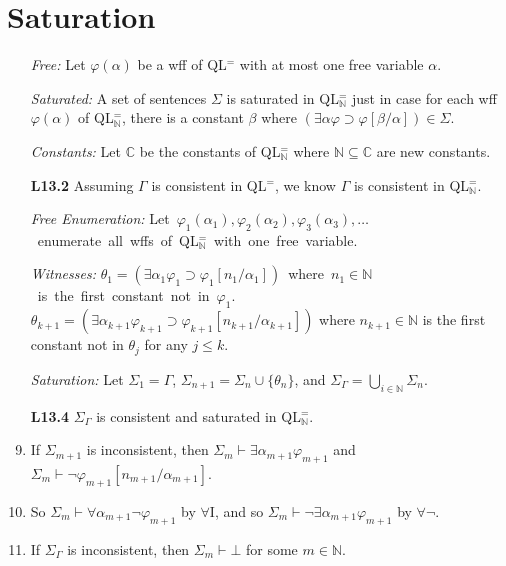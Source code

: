 \documentclass[a4paper, 11pt]{article} %
\def\proves{\ensuremath{\vdash}}
\newcommand{\set}[1]{\lbrace#1\rbrace} %
\newcommand{\N}{\mathbb{N}}
\newcommand{\C}{\mathbb{C}}
\newcommand{\qt}[2]{#1 #2} %
\newcommand{\unisub}[2]{[#1/#2]}
\def\metaA{\ensuremath{\varphi}}
\begin{document}
\section*{Saturation}

\begin{enumerate}
  \item[\it Free:] Let $\metaA(\alpha)$ be a wff of QL$^=$ with at most one free variable $\alpha$.
  \item[\it Saturated:] A set of sentences $\Sigma$ is saturated in QL$^=_{\N}$ just in case for each wff $\metaA(\alpha)$ of QL$^=_{\N}$, there is a constant $\beta$ where $(\qt{\exists}{\alpha}\metaA \supset \metaA\unisub{\beta}{\alpha})\in\Sigma$.
  \item[\it Constants:] Let $\C$ be the constants of QL$^=_{\N}$ where $\N\subseteq\C$ are new constants.
  \item[\bf L13.2] Assuming $\Gamma$ is consistent in QL$^=$, we know $\Gamma$ is consistent in QL$^=_{\N}$.
  \item[\it Free Enumeration:] \mbox{Let $\metaA_1(\alpha_1),\metaA_2(\alpha_2),\metaA_3(\alpha_3),\ldots$ enumerate all wffs of QL$^=_{\N}$ with one free variable.}
  \item[\it Witnesses:] \mbox{$\theta_1=(\qt{\exists}{\alpha_1}\metaA_1\supset \metaA_1\unisub{n_1}{\alpha_1})$ where $n_1\in\N$ is the first constant not in $\metaA_1$.}\vspace{.05in}\\
    $\theta_{k+1}=(\qt{\exists}{\alpha_{k+1}}\metaA_{k+1}\supset \metaA_{k+1}\unisub{n_{k+1}}{\alpha_{k+1}})$  where $n_{k+1}\in\N$ is the first constant not in $\theta_j$ for any $j\leq k$.
  \item[\it Saturation:] Let $\Sigma_1 = \Gamma$, $\Sigma_{n+1} = \Sigma_n\cup\set{\theta_n}$, and $\Sigma_\Gamma = \bigcup_{i\in\N}\Sigma_n$.
  \item[\bf L13.4] $\Sigma_\Gamma$ is consistent and saturated in QL$^=_{\N}$.
  \item If $\Sigma_{m+1}$ is inconsistent, then $\Sigma_m\proves \qt{\exists}{\alpha_{m+1}}\metaA_{m+1}$ and $\Sigma_m\proves\neg\metaA_{m+1}\unisub{n_{m+1}}{\alpha_{m+1}}$.
  \item So $\Sigma_m\proves \qt{\forall}{\alpha_{m+1}}\neg\metaA_{m+1}$ by $\forall$I, and so $\Sigma_m\proves \neg\qt{\exists}{\alpha_{m+1}}\metaA_{m+1}$ by $\forall\neg$.
  \item If $\Sigma_\Gamma$ is inconsistent, then $\Sigma_m\proves\bot$ for some $m\in\N$.
\end{enumerate}
\end{document}
